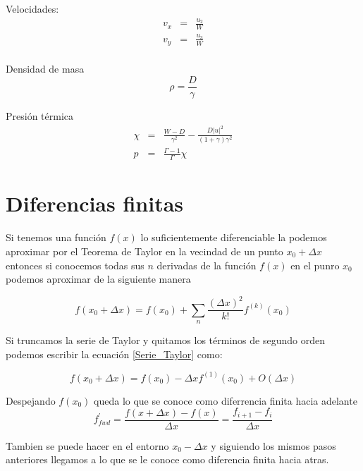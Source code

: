 \documentclass[12pt,a4paper]{book}
\providecommand{\abs}[1]{\lvert#1\rvert} %
\begin{document}
Velocidades:
\begin{eqnarray}
v_{x}&=&\frac{u_{2}}{W}\\
v_{y}&=&\frac{u_{3}}{W}\\
\end{eqnarray}

Densidad de masa 
\begin{equation}
\rho=\frac{D}{\gamma}
\end{equation}

Presión térmica
\begin{eqnarray}
\chi&=&\frac{W-D}{\gamma^{2}}-\frac{D \abs{u}^{2}}{(1+\gamma)\gamma^{2}}\\
p&=&\frac{\Gamma-1}{\Gamma} \chi
\end{eqnarray}



\section{Diferencias finitas}
Si tenemos una función $f(x)$ lo suficientemente diferenciable la podemos aproximar por el Teorema de Taylor  en la vecindad de un punto $x_0+\Delta x$ entonces si conocemos todas sus $n$ derivadas de la función $f(x)$ en el punro $x_0$ podemos aproximar de la siguiente manera

\begin{equation}\label{Serie_Taylor}
f\left( x_0 + \Delta x\right) = f\left( x_0 \right)+
\sum_n \frac{\left( \Delta x \right) ^2}{k!}f^{(k)} \left(x_0
\right)
\end{equation}

Si truncamos la serie de Taylor y quitamos los términos de segundo orden podemos escribir la ecuación \ref{Serie_Taylor} como:

\begin{equation}
f\left( x_0 + \Delta x \right) = f(x_0) - \Delta x f^{(1)} (x_0) + O \left( \Delta x \right)
\end{equation}

Despejando $f(x_0)$ queda lo que se conoce como diferrencia finita hacia adelante
\begin{equation}\label{fwd}
f_{fwd}^{'}=\frac{f\left(x + \Delta x \right) - f(x) }{\Delta x}=\frac{f_{i+1}-f_{i}}{\Delta x}
\end{equation}

Tambien se puede hacer en el entorno $x_0- \Delta x$ y siguiendo los mismos pasos anteriores llegamos a lo que se le conoce como diferencia finita hacia atras.
\end{document}
